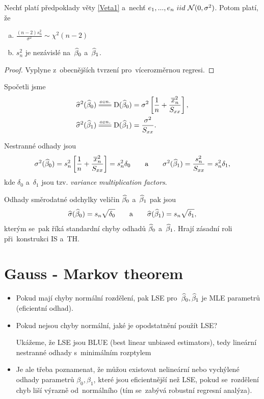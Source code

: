 \begin{corollary}\label{tvrzeni}
	Nechť platí předpoklady věty \ref{Veta1} a~nechť $e_1,..., e_n~iid~\mathcal{N}(0,\sigma^2)$. Potom platí, že
	\begin{enumerate}[a)]
		\item $\frac{(n-2)s_n^2}{\sigma^2} \sim \chi^2(n-2)$
		\item $s_n^2$ je nezávislé na~$\widehat{\beta}_0$ a~$\widehat{\beta}_1$.
	\end{enumerate}
\end{corollary}
\begin{proof}
	Vyplyne z~obecnějších tvrzení pro~vícerozměrnou regresi.
\end{proof}


\begin{remark}
	Spočetli jsme
	 \begin{align}
		\widehat{\sigma}^2(\wbeta_0) & \equal{ozn.}\D(\wbeta_0) = \sigma^2 \left[\frac{1}{n} + \frac{\lxn^2}{\Sxx} \right], \label{Vzorec: sigma(beta_0)} \\
		\widehat{\sigma}^2(\wbeta_1) & \equal{ozn.}\D(\wbeta_1) = \frac{\sigma^2}{\Sxx}. \label{Vzorec: sigma(beta_1)}
	 \end{align}
	
	Nestranné odhady jsou
	$$
		\sigma^2(\widehat{\beta}_0) = s_n^2  \left[\frac{1}{n} + \frac{\overline{x}_n^2}{S_{xx}} \right] = s_n^2 \delta_0 \qquad\text{a}\qquad
		\sigma^2(\widehat{\beta}_1) = \frac{s_n^2}{S_{xx}} = s_n^2 \delta_1,
	$$
	kde $\delta_0$ a~$\delta_1$ jsou tzv. \textit{variance multiplication factors}.
	
	Odhady směrodatné odchylky veličin $\widehat{\beta}_0$ a~$\widehat{\beta}_1$ pak jsou
	 $$
		\widehat{\sigma}(\widehat{\beta}_0) = s_n \sqrt{\delta_0} \qquad \text{a} \qquad \widehat{\sigma}(\widehat{\beta}_1) = s_n \sqrt{\delta_1},
	 $$
	kterým se~pak říká standardní chyby odhadů $\widehat{\beta}_0$ a~$\widehat{\beta}_1$. Hrají zásadní roli při~konstrukci IS a~TH.
\end{remark}

\section{Gauss - Markov theorem}

\begin{itemize}
	\item Pokud mají chyby normální rozdělení, pak LSE pro~$\widehat{\beta}_0, \widehat{\beta}_1$ je MLE parametrů (eficientní odhad).
	\item Pokud nejsou chyby normální, jaké je opodstatnění použít LSE?
	
	Ukážeme, že LSE jsou BLUE (best linear unbiased estimators), tedy lineární nestranné odhady s~minimálním rozptylem
	\item Je ale třeba poznamenat, že můžou existovat nelineární nebo vychýlené odhady parametrů $\beta_0, \beta_1$, které jsou eficientnější než LSE, pokud se~rozdělení chyb liší výrazně od~normálního (tím se~zabývá robustní regresní analýza).
\end{itemize}

